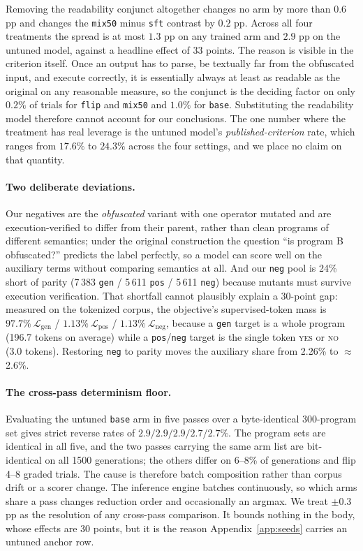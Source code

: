 \documentclass{article}
\newcommand{\arm}[1]{\texttt{#1}}
\begin{document}
Removing the readability conjunct altogether changes no arm by more than $0.6$ pp and changes
the \arm{mix50} minus \arm{sft} contrast by $0.2$ pp. Across all four treatments the spread is
at most $1.3$ pp on any trained arm and $2.9$ pp on the untuned model, against a headline
effect of 33 points. The reason is visible in the criterion itself. Once an output has to
parse, be textually far from the obfuscated input, and execute correctly, it is essentially
always at least as readable as the original on any reasonable measure, so the conjunct is the
deciding factor on only $0.2\%$ of trials for \arm{flip} and \arm{mix50} and $1.0\%$ for
\arm{base}. Substituting the readability model therefore cannot account for our conclusions.
The one number where the treatment has real leverage is the untuned model's
\emph{published-criterion} rate, which ranges from $17.6\%$ to $24.3\%$ across the four
settings, and we place no claim on that quantity.

\paragraph{Two deliberate deviations.} Our negatives are the \emph{obfuscated} variant
with one operator mutated and are execution-verified to differ from their parent, rather
than clean programs of different semantics; under the original construction the question
``is program B obfuscated?'' predicts the label perfectly, so a model can score well on the
auxiliary terms without comparing semantics at all. And our \arm{neg} pool is 24\% short of
parity (7\,383 \arm{gen} / 5\,611 \arm{pos} / 5\,611 \arm{neg}) because mutants must
survive execution verification. That shortfall cannot plausibly explain a 30-point gap:
measured on the tokenized corpus, the objective's supervised-token mass is
$97.7\%\ \mathcal{L}_{\mathrm{gen}}$ / $1.13\%\ \mathcal{L}_{\mathrm{pos}}$ /
$1.13\%\ \mathcal{L}_{\mathrm{neg}}$, because a \arm{gen} target is a whole program (196.7
tokens on average) while a \arm{pos}/\arm{neg} target is the single token \textsc{yes} or
\textsc{no} (3.0 tokens). Restoring \arm{neg} to parity moves the auxiliary share from
2.26\% to $\approx$2.6\%.

\paragraph{The cross-pass determinism floor.} Evaluating the untuned \arm{base} arm in five
passes over a byte-identical 300-program set gives strict reverse rates of $2.9/2.9/2.9/
2.7/2.7\%$. The program sets are identical in all five, and the two passes carrying the same
arm list are bit-identical on all 1500 generations; the others differ on 6--8\% of
generations and flip 4--8 graded trials. The cause is therefore batch composition rather
than corpus drift or a scorer change. The inference engine batches continuously, so which
arms share a pass changes reduction order and occasionally an argmax. We treat $\pm0.3$ pp as
the resolution of any cross-pass comparison. It bounds nothing in the body, whose effects
are 30 points, but it is the reason Appendix~\ref{app:seeds} carries an untuned anchor row.
\end{document}
